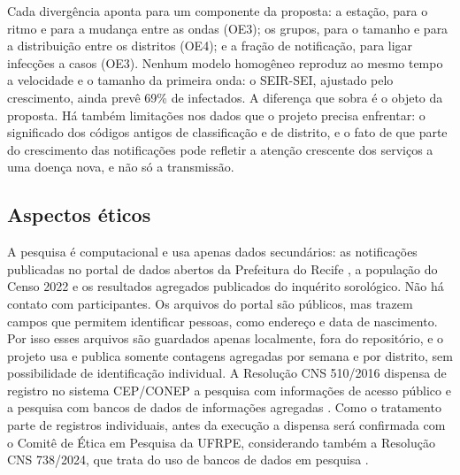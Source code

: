 Cada divergência aponta para um componente da proposta: a estação, para o ritmo e para a mudança entre as
ondas (OE3); os grupos, para o tamanho e para a distribuição entre os distritos (OE4); e a fração de
notificação, para ligar infecções a casos (OE3). Nenhum modelo homogêneo reproduz ao mesmo tempo a
velocidade e o tamanho da primeira onda: o SEIR-SEI, ajustado pelo crescimento, ainda prevê 69\% de
infectados. A diferença que sobra é o objeto da proposta. Há também limitações nos dados que o projeto
precisa enfrentar: o significado dos códigos antigos de classificação e de distrito, e o fato de que
parte do crescimento das notificações pode refletir a atenção crescente dos serviços a uma doença nova, e
não só a transmissão.

\subsection{Aspectos éticos}

A pesquisa é computacional e usa apenas dados secundários: as notificações publicadas no portal de dados
abertos da Prefeitura do Recife \cite{recife2026}, a população do Censo 2022 e os resultados agregados
publicados do inquérito sorológico. Não há contato com participantes. Os arquivos do portal são públicos,
mas trazem campos que permitem identificar pessoas, como endereço e data de nascimento. Por isso esses
arquivos são guardados apenas localmente, fora do repositório, e o projeto usa e publica somente contagens
agregadas por semana e por distrito, sem possibilidade de identificação individual. A Resolução CNS
510/2016 dispensa de registro no sistema CEP/CONEP a pesquisa com informações de acesso público e a
pesquisa com bancos de dados de informações agregadas \cite{cns510}. Como o tratamento parte de registros
individuais, antes da execução a dispensa será confirmada com o Comitê de Ética em Pesquisa da UFRPE,
considerando também a Resolução CNS 738/2024, que trata do uso de bancos de dados em pesquisa
\cite{cns738}.
